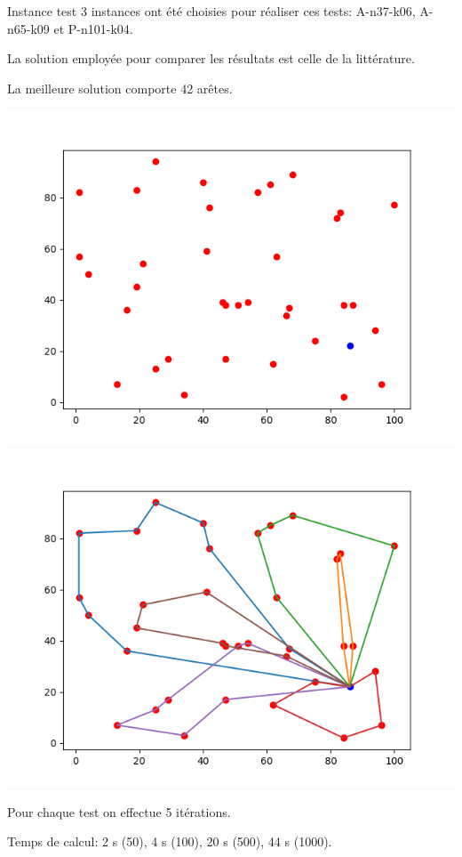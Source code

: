 \documentclass{beamer}
\begin{document}
\begin{frame}{Instance test}
3 instances ont été choisies pour réaliser ces tests: A-n37-k06, A-n65-k09 et P-n101-k04.

La solution employée pour comparer les résultats est celle de la littérature.

La meilleure solution comporte 42 arêtes.

\includegraphics[scale=0.3]{instance3706.png}
\includegraphics[scale=0.3]{best3706.png}

Pour chaque test on effectue 5 itérations.

Temps de calcul: 2 s (50), 4 s (100), 20 s (500), 44 s (1000).
\end{frame}
\end{document}
